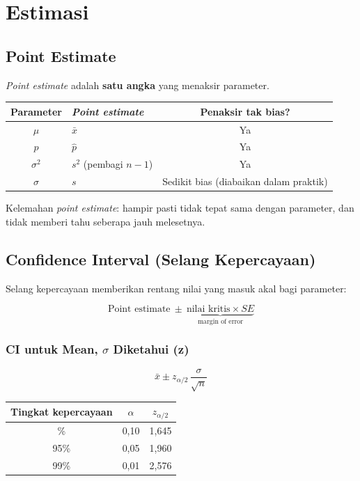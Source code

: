 \documentclass[
  indonesian,
  letterpaper,
]{book}
\newcounter{none} %
\begin{document}
\section{Estimasi}\label{estimasi}

\subsection{Point Estimate}\label{point-estimate}

\emph{Point estimate} adalah \textbf{satu angka} yang menaksir
parameter.

{\def\LTcaptype{none} %
\begin{longtable}[]{@{}clc@{}}
\toprule\noalign{}
Parameter & \emph{Point estimate} & Penaksir tak bias? \\
\midrule\noalign{}
\endhead
\bottomrule\noalign{}
\endlastfoot
\(\mu\) & \(\bar{x}\) & Ya \\
\(p\) & \(\hat{p}\) & Ya \\
\(\sigma^2\) & \(s^2\) (pembagi \(n-1\)) & Ya \\
\(\sigma\) & \(s\) & Sedikit bias (diabaikan dalam praktik) \\
\end{longtable}
}

Kelemahan \emph{point estimate}: hampir pasti tidak tepat sama dengan
parameter, dan tidak memberi tahu seberapa jauh melesetnya.

\subsection{Confidence Interval (Selang
Kepercayaan)}\label{confidence-interval-selang-kepercayaan}

Selang kepercayaan memberikan rentang nilai yang masuk akal bagi
parameter:

\[
\text{Point estimate} \ \pm\ \underbrace{\text{nilai kritis} \times SE}_{\text{margin of error}}
\]

\subsubsection{\texorpdfstring{CI untuk Mean, \(\sigma\) Diketahui
(z)}{CI untuk Mean, \textbackslash sigma Diketahui (z)}}\label{ci-untuk-mean-sigma-diketahui-z}

\[
\bar{x} \pm z_{\alpha/2}\,\frac{\sigma}{\sqrt{n}}
\]

{\def\LTcaptype{none} %
\begin{longtable}[]{@{}ccc@{}}
\toprule\noalign{}
Tingkat kepercayaan & \(\alpha\) & \(z_{\alpha/2}\) \\
\midrule\noalign{}
\endhead
\bottomrule\noalign{}
\endlastfoot
90\% & 0,10 & 1,645 \\
95\% & 0,05 & 1,960 \\
99\% & 0,01 & 2,576 \\
\end{longtable}
}
\end{document}
